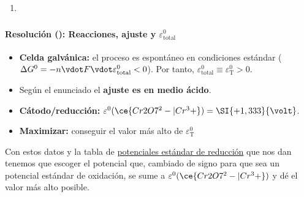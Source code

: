 \begin{frame}
\begin{center}
\begin{enumerate}[label={\alph*)},font={\color{red!50!black}\bfseries}]
					\\[.2cm]
			\item	{}\quad
					\quad
		\end{enumerate}
	\end{center}
\end{frame}

\begin{frame}
	\frametitle{\ejerciciocmd}
	\framesubtitle{Resolución (): Reacciones, ajuste y $\varepsilon^0_{\text{total}}$}
	\begin{overprint}
			\begin{itemize}
				\item\textbf{Celda galvánica:} el proceso es espontáneo en condiciones estándar ($\Delta G^0 = - n\vdot F\vdot\varepsilon^0_{\text{total}} < 0$). Por tanto, $\varepsilon^0_{\text{total}}\equiv\varepsilon^0_{\text{T}} > 0$.
				\item Según el enunciado el \textbf{ajuste es en medio ácido}.
				\item\textbf{Cátodo/reducción:} $\varepsilon^0(\ce{Cr2O7^2-|Cr^3+}) = \SI{+1,333}{\volt}$.
				\item\textbf{Maximizar:} conseguir el valor más alto de $\varepsilon^0_\text{T}$
			\end{itemize}
			Con estos datos y la tabla de \underline{potenciales estándar de reducción} que nos dan tenemos que escoger el potencial que, cambiado de signo para que sea un potencial estándar de oxidación, se sume a $\varepsilon^0(\ce{Cr2O7^2-|Cr^3+})$ y dé el valor más alto posible.


\end{overprint}
\end{frame}
